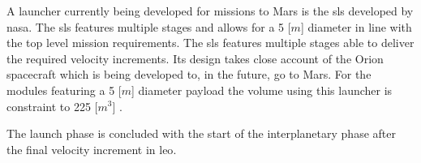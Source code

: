 A launcher currently being developed for missions to Mars is the \acrfull{sls} developed by \gls{nasa}. The \gls{sls} features multiple stages and allows for a 5 [$m$] diameter in line with the top level mission requirements. The \gls{sls} features multiple stages able to deliver the required velocity increments. Its design takes close account of the Orion spacecraft which is being developed to, in the future, go to Mars. For the modules featuring a 5 [$m$] diameter payload the volume using this launcher is constraint to 225 [$m^3$] \cite{NASA2014}.

The launch phase is concluded with the start of the interplanetary phase after the final velocity increment in \gls{leo}. 

